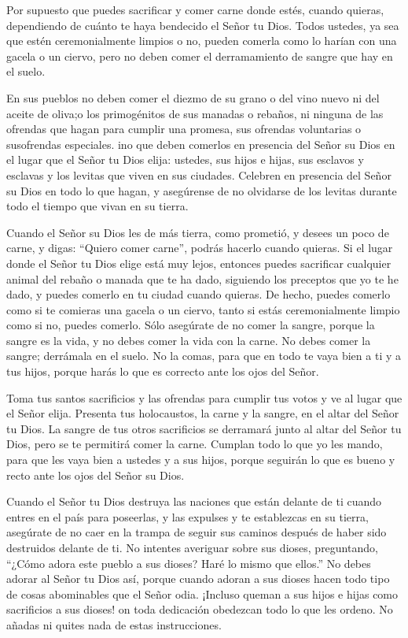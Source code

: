  Por supuesto que puedes sacrificar y comer carne donde
estés, cuando quieras, dependiendo de cuánto te haya bendecido el Señor
tu Dios. Todos ustedes, ya sea que estén ceremonialmente limpios o no,
pueden comerla como lo harían con una gacela o un ciervo, 
pero no deben comer el derramamiento de sangre que hay en el suelo.

 En sus pueblos no deben comer el diezmo de su grano o del
vino nuevo ni del aceite de oliva;o los primogénitos de sus manadas o
rebaños, ni ninguna de las ofrendas que hagan para cumplir una promesa,
sus ofrendas voluntarias o susofrendas especiales.  ino que
deben comerlos en presencia del Señor su Dios en el lugar que el Señor
tu Dios elija: ustedes, sus hijos e hijas, sus esclavos y esclavas y los
levitas que viven en sus ciudades. Celebren en presencia del Señor su
Dios en todo lo que hagan,  y asegúrense de no olvidarse de
los levitas durante todo el tiempo que vivan en su tierra.

 Cuando el Señor su Dios les de más tierra, como prometió,
y desees un poco de carne, y digas: ``Quiero comer carne'', podrás
hacerlo cuando quieras.  Si el lugar donde el Señor tu Dios
elige está muy lejos, entonces puedes sacrificar cualquier animal del
rebaño o manada que te ha dado, siguiendo los preceptos que yo te he
dado, y puedes comerlo en tu ciudad cuando quieras.  De
hecho, puedes comerlo como si te comieras una gacela o un ciervo, tanto
si estás ceremonialmente limpio como si no, puedes comerlo.
 Sólo asegúrate de no comer la sangre, porque la sangre es
la vida, y no debes comer la vida con la carne.  No debes
comer la sangre; derrámala en el suelo.  No la comas, para
que en todo te vaya bien a ti y a tus hijos, porque harás lo que es
correcto ante los ojos del Señor.

 Toma tus santos sacrificios y las ofrendas para cumplir
tus votos y ve al lugar que el Señor elija.  Presenta tus
holocaustos, la carne y la sangre, en el altar del Señor tu Dios. La
sangre de tus otros sacrificios se derramará junto al altar del Señor tu
Dios, pero se te permitirá comer la carne.  Cumplan todo lo
que yo les mando, para que les vaya bien a ustedes y a sus hijos, porque
seguirán lo que es bueno y recto ante los ojos del Señor su Dios.

 Cuando el Señor tu Dios destruya las naciones que están
delante de ti cuando entres en el país para poseerlas, y las expulses y
te establezcas en su tierra,  asegúrate de no caer en la
trampa de seguir sus caminos después de haber sido destruidos delante de
ti. No intentes averiguar sobre sus dioses, preguntando, ``¿Cómo adora
este pueblo a sus dioses? Haré lo mismo que ellos.''  No
debes adorar al Señor tu Dios así, porque cuando adoran a sus dioses
hacen todo tipo de cosas abominables que el Señor odia. ¡Incluso queman
a sus hijos e hijas como sacrificios a sus dioses!  on toda
dedicación obedezcan todo lo que les ordeno. No añadas ni quites nada de
estas instrucciones.

